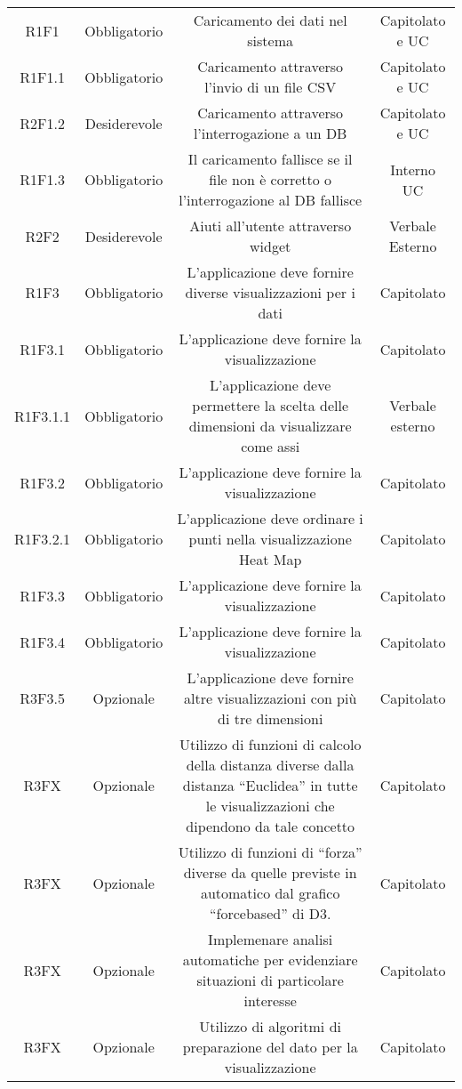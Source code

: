 \begin{center}
\begin{longtable}{C{\colA} C{\colB} C{\colC} C{\colA}}
R1F1 & Obbligatorio & Caricamento dei dati nel sistema & Capitolato e UC\\
R1F1.1 & Obbligatorio & Caricamento attraverso l'invio di un file CSV & Capitolato e UC\\
R2F1.2 & Desiderevole & Caricamento attraverso l'interrogazione a un DB & Capitolato e UC\\
R1F1.3 & Obbligatorio & Il caricamento fallisce se il file non è corretto o l'interrogazione al DB fallisce & Interno UC\\
R2F2 & Desiderevole & Aiuti all'utente attraverso widget & Verbale Esterno\\
R1F3 & Obbligatorio & L'applicazione deve fornire diverse visualizzazioni per i dati & Capitolato\\
R1F3.1 & Obbligatorio & L'applicazione deve fornire la visualizzazione  & Capitolato\\
R1F3.1.1 & Obbligatorio & L'applicazione deve permettere la scelta delle dimensioni da visualizzare come assi & Verbale esterno\\
R1F3.2 & Obbligatorio & L'applicazione deve fornire la visualizzazione  & Capitolato\\
R1F3.2.1 & Obbligatorio & L'applicazione deve ordinare i punti nella visualizzazione Heat Map & Capitolato \\
R1F3.3 & Obbligatorio & L'applicazione deve fornire la visualizzazione  & Capitolato\\
R1F3.4 & Obbligatorio & L'applicazione deve fornire la visualizzazione  & Capitolato \\
R3F3.5 & Opzionale & L'applicazione deve fornire altre visualizzazioni con più di tre dimensioni & Capitolato\\
R3FX & Opzionale & Utilizzo di funzioni di calcolo della distanza diverse dalla distanza “Euclidea” in tutte le visualizzazioni che dipendono da tale concetto & Capitolato \\
R3FX & Opzionale & Utilizzo di funzioni di “forza” diverse da quelle previste in automatico dal grafico “forcebased” di D3. & Capitolato\\
R3FX & Opzionale & Implemenare analisi automatiche per evidenziare situazioni di particolare interesse & Capitolato\\
R3FX & Opzionale & Utilizzo di algoritmi di preparazione del dato per la visualizzazione & Capitolato\\
\end{longtable}
\end{center}



